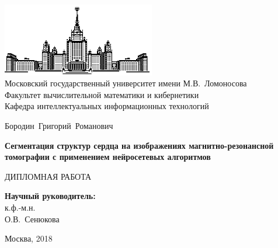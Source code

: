 \documentclass[14pt, a4paper]{extarticle}
\begin{document}
\thispagestyle{empty}

\begin{center}
\ \vspace{-3cm}

\includegraphics[width=0.5\textwidth]{img/msu.eps}\\
{Московский государственный университет имени М.В.~Ломоносова}\\
Факультет вычислительной математики и кибернетики\\
Кафедра интеллектуальных информационных технологий

\vspace{5cm}

{\Large Бородин~Григорий~Романович}

\vspace{1cm}

{\Large\bfseries
Сегментация структур сердца на изображениях магнитно-резонансной томографии с применением нейросетевых алгоритмов\\}

\vspace{1cm}

{\large ДИПЛОМНАЯ РАБОТА}
\end{center}

\vfill

\begin{flushright}
  \textbf{Научный руководитель:}\\
  к.ф.-м.н.\\
  О.В.~Сенюкова
\end{flushright}

\vfill

\begin{center}
Москва, 2018
\end{center}

\enlargethispage{4\baselineskip}
\end{document}
